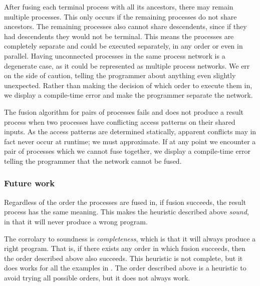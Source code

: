 After fusing each terminal process with all its ancestors, there may remain multiple processes.
This only occurs if the remaining processes do not share ancestors.
The remaining processes also cannot share descendents, since if they had descendents they would not be terminal.
This means the processes are completely separate and could be executed separately, in any order or even in parallel.
Having unconnected processes in the same process network is a degenerate case, as it could be represented as multiple process networks.
We err on the side of caution, telling the programmer about anything even slightly unexpected.
Rather than making the decision of which order to execute them in, we display a compile-time error and make the programmer separate the network.

The fusion algorithm for pairs of processes fails and does not produce a result process when two processes have conflicting access patterns on their shared inputs.
As the access patterns are determined statically, apparent conflicts may in fact never occur at runtime; we must approximate.
If at any point we encounter a pair of processes which we cannot fuse together, we display a compile-time error telling the programmer that the network cannot be fused.

\subsubsection{Future work}
\label{s:extraction:future}

Regardless of the order the processes are fused in, if fusion succeeds, the result process has the same meaning.
This makes the heuristic described above \emph{sound}, in that it will never produce a wrong program.

The corrolary to soundness is \emph{completeness}, which is that it will always produce a right program.
That is, if there exists any order in which fusion succeeds, then the order described above also succeeds.
This heuristic is not complete, but it does works for all the examples in .
The order described above is a heuristic to avoid trying all possible orders, but it does not always work.

